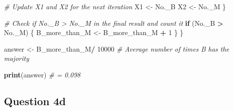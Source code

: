 \documentclass[
]{article}
\newenvironment{Shaded}{\begin{snugshade}}{\end{snugshade}}
\newcommand{\CommentTok}[1]{\textcolor[rgb]{0.56,0.35,0.01}{\textit{#1}}}
\newcommand{\ControlFlowTok}[1]{\textcolor[rgb]{0.13,0.29,0.53}{\textbf{#1}}}
\newcommand{\DecValTok}[1]{\textcolor[rgb]{0.00,0.00,0.81}{#1}}
\newcommand{\FunctionTok}[1]{\textcolor[rgb]{0.13,0.29,0.53}{\textbf{#1}}}
\newcommand{\NormalTok}[1]{#1}
\newcommand{\OtherTok}[1]{\textcolor[rgb]{0.56,0.35,0.01}{#1}}
\newcommand{\SpecialCharTok}[1]{\textcolor[rgb]{0.81,0.36,0.00}{\textbf{#1}}}
\begin{document}
\begin{Shaded}
\begin{Highlighting}[]
    \CommentTok{\# Update X1 and X2 for the next iteration}
\NormalTok{    X1 }\OtherTok{\textless{}{-}}\NormalTok{ No.\_B}
\NormalTok{    X2 }\OtherTok{\textless{}{-}}\NormalTok{ No.\_M}
\NormalTok{  \}}
  
  \CommentTok{\# Check if No.\_B \textgreater{} No.\_M in the final result and count it}
  \ControlFlowTok{if}\NormalTok{ (No.\_B }\SpecialCharTok{\textgreater{}}\NormalTok{ No.\_M) \{}
\NormalTok{    B\_more\_than\_M }\OtherTok{\textless{}{-}}\NormalTok{ B\_more\_than\_M }\SpecialCharTok{+} \DecValTok{1}
\NormalTok{  \}}
\NormalTok{\}}

\NormalTok{answer }\OtherTok{\textless{}{-}}\NormalTok{ B\_more\_than\_M}\SpecialCharTok{/} \DecValTok{10000}  \CommentTok{\# Average number of times B has the majority}

\FunctionTok{print}\NormalTok{(answer)  }\CommentTok{\# = 0.098}
\end{Highlighting}
\end{Shaded}

\subsection{Question 4d}\label{question-4d}
\end{document}
